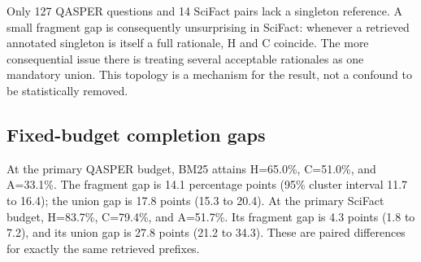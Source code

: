 \documentclass[twoside,a4paper,11pt]{article}
\begin{document}
Only 127 QASPER questions and 14 SciFact pairs lack a singleton reference. A small fragment gap is consequently unsurprising in SciFact: whenever a retrieved annotated singleton is itself a full rationale, H and C coincide. The more consequential issue there is treating several acceptable rationales as one mandatory union. This topology is a mechanism for the result, not a confound to be statistically removed.


\subsection{Fixed-budget completion gaps}
At the primary QASPER budget, BM25 attains H=65.0\%, C=51.0\%, and A=33.1\%. The fragment gap is 14.1 percentage points (95\% cluster interval 11.7 to 16.4); the union gap is 17.8 points (15.3 to 20.4). At the primary SciFact budget, H=83.7\%, C=79.4\%, and A=51.7\%. Its fragment gap is 4.3 points (1.8 to 7.2), and its union gap is 27.8 points (21.2 to 34.3). These are paired differences for exactly the same retrieved prefixes.
\end{document}
